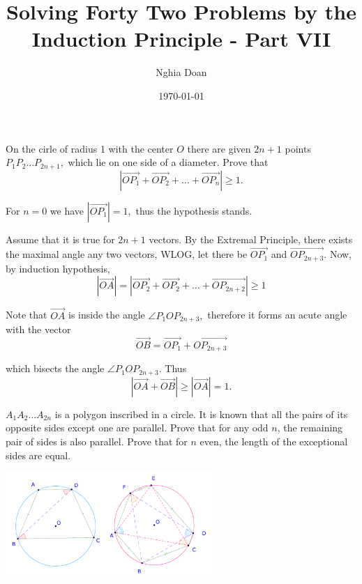 \documentclass{article}
\title{Solving Forty Two Problems by the Induction Principle - Part VII}
\author{Nghia Doan}
\date{\today}
\begin{document}
\maketitle

\begin{problem}
    On the cirle of radius 1 with the center $O$ there are given $2n+1$ points $P_1P_2 \ldots P_{2n+1},$
    which lie on one side of a diameter. Prove that
    \[
        | \overrightarrow{OP_1} + \overrightarrow{OP_2} + \ldots  + \overrightarrow{OP_n} | \ge 1.
    \]
\end{problem}

\begin{soln}
    For $n=0$ we have $|\overrightarrow{OP_1} | = 1,$ thus the hypothesis stands.

    Assume that it is true for $2n+1$ vectors. By the Extremal Principle, there exists the maximal angle any two vectors,
    WLOG, let there be $\overrightarrow{OP_1}$ and $\overrightarrow{OP_{2n+3}}.$
    Now, by induction hypothesis,
    \[
        |\overrightarrow{OA}| = |\overrightarrow{OP_2} + \overrightarrow{OP_2} + \ldots  + \overrightarrow{OP_{2n+2}}| \ge 1 
    \]

    Note that $\overrightarrow{OA}$ is inside the angle $\angle P_1 O P_{2n+3},$ therefore it forms an acute angle with the vector 
    \[
        \overrightarrow{OB} = \overrightarrow{OP_1} + \overrightarrow{OP_{2n+3}}
    \]

    which bisects the angle $\angle P_1 O P_{2n+3}.$ Thus
    \[
        |\overrightarrow{OA} + \overrightarrow{OB}| \ge |\overrightarrow{OA}| = 1.
    \] 
\end{soln}

\begin{problem}
    $A_1 A_2 \ldots A_{2n}$ is a polygon inscribed in a circle. It is known that all the pairs of its opposite sides except one are parallel.
    Prove that for any odd $n$, the remaining pair of sides is also parallel.
    Prove that for $n$ even, the length of the exceptional sides are equal.
\end{problem}

\begin{center}
    \includegraphics[width=8cm]{./svg/pdf/23-24-s5-o-p35.pdf}
\end{center}
\end{document}
